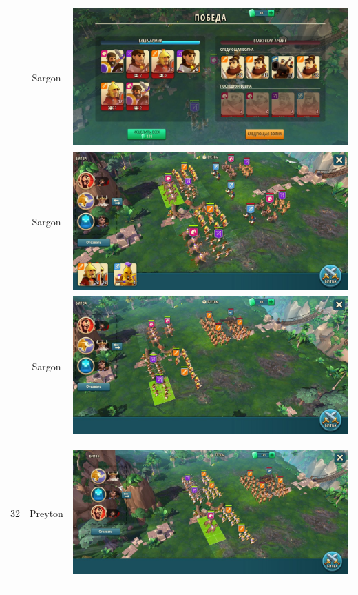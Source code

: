 \begin{longtable}{|c|c|c|}
	& Sargon &
	\includegraphics[width=0.75\linewidth]{./parts/media/TreasureHunt/32/sargon/photo_2022-04-07_10-05-39.jpg} \\
	& Sargon &
	\includegraphics[width=0.75\linewidth]{./parts/media/TreasureHunt/32/sargon/photo_2022-04-07_10-05-31.jpg} \\
	& Sargon &
	\includegraphics[width=0.75\linewidth]{./parts/media/TreasureHunt/32/sargon/photo_2022-04-07_10-05-42.jpg} \\
	\hline
	\multirow{16}{*}{32} & Preyton &
	\hypertarget{fight32}{\includegraphics[width=0.75\linewidth]{./parts/media/TreasureHunt/32/Preyton/32.2.jpg}} \\

\end{longtable}
